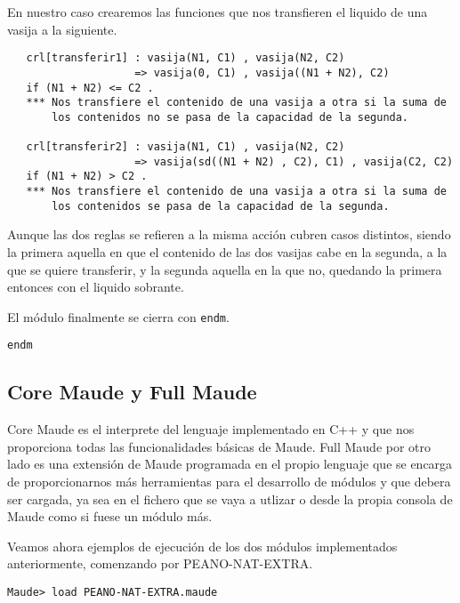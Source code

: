 En nuestro caso crearemos las funciones que nos transfieren el liquido de una vasija a la siguiente.\par 
{\codesize
\begin{verbatim}
   crl[transferir1] : vasija(N1, C1) , vasija(N2, C2) 
                    => vasija(0, C1) , vasija((N1 + N2), C2) 
   if (N1 + N2) <= C2 .
   *** Nos transfiere el contenido de una vasija a otra si la suma de 
       los contenidos no se pasa de la capacidad de la segunda.

   crl[transferir2] : vasija(N1, C1) , vasija(N2, C2) 
                    => vasija(sd((N1 + N2) , C2), C1) , vasija(C2, C2)
   if (N1 + N2) > C2 .
   *** Nos transfiere el contenido de una vasija a otra si la suma de 
       los contenidos se pasa de la capacidad de la segunda.
\end{verbatim}
}
Aunque las dos reglas se refieren a la misma acción cubren casos distintos, siendo la primera aquella en que el contenido de las dos vasijas cabe en la segunda, a la que se quiere transferir, y la segunda aquella en la que no, quedando la primera entonces con el liquido sobrante.\par

El módulo finalmente se cierra con \texttt{endm}.
{\codesize
\begin{verbatim}
endm
\end{verbatim}
}

\subsection{Core Maude y Full Maude}

Core Maude es el interprete del lenguaje implementado en C++ y que nos proporciona todas las funcionalidades básicas de Maude. Full Maude por otro lado es una extensión de Maude programada en el propio lenguaje que se encarga de proporcionarnos más herramientas para el desarrollo de módulos y que debera ser cargada, ya sea en el fichero que se vaya a utlizar o desde la propia consola de Maude como si fuese un módulo más.\par

Veamos ahora ejemplos de ejecución de los dos módulos implementados anteriormente, comenzando por PEANO-NAT-EXTRA.\par

{\codesize
\begin{verbatim}
Maude> load PEANO-NAT-EXTRA.maude
\end{verbatim}
}

